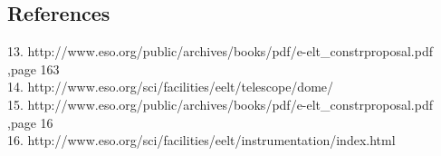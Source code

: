 \documentclass[pdf,color]{UoBnote}
\begin{document}
\subsection{References}

13.	http://www.eso.org/public/archives/books/pdf/e-elt\_constrproposal.pdf ,page 163
\\
14.	http://www.eso.org/sci/facilities/eelt/telescope/dome/
\\
15.	http://www.eso.org/public/archives/books/pdf/e-elt\_constrproposal.pdf ,page 16
\\
16.	http://www.eso.org/sci/facilities/eelt/instrumentation/index.html
\end{document}
